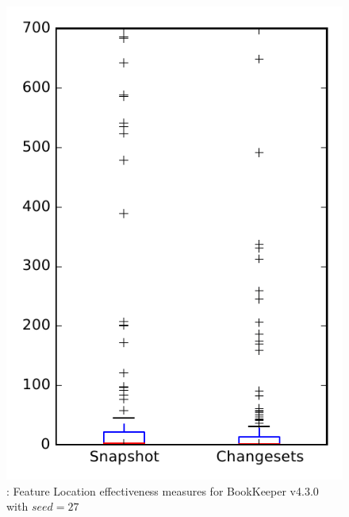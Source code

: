 
\begin{figure}
\centering
\includegraphics[height=0.4\textheight]{figures/flt_seed/rq1_bookkeeper_27}
\caption{\rone: Feature Location effectiveness measures for BookKeeper v4.3.0 with $seed=27$}
\label{fig:flt_seed:rq1:bookkeeper}
\end{figure}
